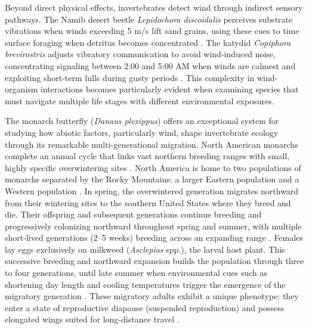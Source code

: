 Beyond direct physical effects, invertebrates detect wind through indirect sensory pathways. The Namib desert beetle \textit{Lepidochora discoidalis} perceives substrate vibrations when winds exceeding 5 m/s lift sand grains, using these cues to time surface foraging when detritus becomes concentrated \parencite{hanrahanEffectWindForaging1997}. The katydid \textit{Copiphora brevirostris} adjusts vibratory communication to avoid wind-induced noise, concentrating signaling between 2:00 and 5:00 AM when winds are calmest and exploiting short-term lulls during gusty periods \parencite{velillaGoneWindSignal2020}. This complexity in wind-organism interactions becomes particularly evident when examining species that must navigate multiple life stages with different environmental exposures.

The monarch butterfly (\textit{Danaus plexippus}) offers an exceptional system for studying how abiotic factors, particularly wind, shape invertebrate ecology through its remarkable multi-generational migration. North American monarchs complete an annual cycle that links vast northern breeding ranges with small, highly specific overwintering sites \parencite{browerUnderstandingMisunderstandingMigration1995,solenskyOverviewMonarchMigration2004,jepsenConservationStatusEcology2015}. North America is home to two populations of monarchs separated by the Rocky Mountains: a larger Eastern population and a Western population \parencite{cockrellTimeTemperatureLatitudinal1993,jepsenConservationStatusEcology2015,freedmanAreEasternWestern2021}. In spring, the overwintered generation migrates northward from their wintering sites to the southern United States where they breed and die. Their offspring and subsequent generations continue breeding and progressively colonizing northward throughout spring and summer, with multiple short-lived generations (2--5 weeks) breeding across an expanding range \parencite{zaluckiTemperatureRateDevelopment1982,cockrellTimeTemperatureLatitudinal1993}. Females lay eggs exclusively on milkweed (\textit{Asclepias} spp.), the larval host plant. This successive breeding and northward expansion builds the population through three to four generations, until late summer when environmental cues such as shortening day length and cooling temperatures trigger the emergence of the migratory generation \parencite{reppertDemystifyingMonarchButterfly2018,goehringEffectsPhotoperiodTemperature2002,hermanJuvenileHormoneRegulation2001,barkerEffectPhotoperiodTemperature1976}. These migratory adults exhibit a unique phenotype: they enter a state of reproductive diapause (suspended reproduction) and possess elongated wings suited for long-distance travel \parencite{barkerEffectPhotoperiodTemperature1976,yangIntrapopulationVariationNatal2016,tuskesOverwinteringEcologyMonarch1978}.

